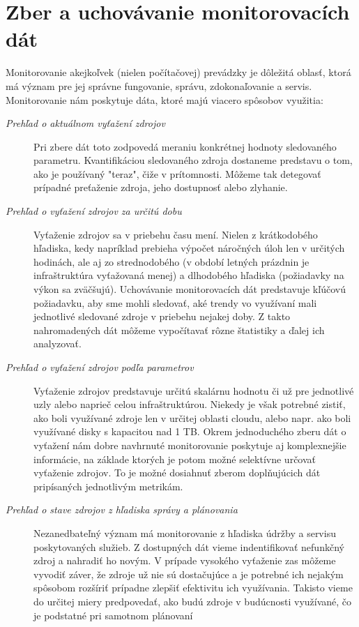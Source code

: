 \documentclass[printed,11pt,twoside,color,cover,table]{fithesis3}
\begin{document}
\chapter{Zber a uchovávanie monitorovacích dát}
Monitorovanie akejkoľvek (nielen počítačovej) prevádzky je dôležitá oblasť, ktorá má význam pre jej správne fungovanie, správu, zdokonaľovanie a servis. Monitorovanie nám poskytuje dáta, ktoré majú viacero 
spôsobov využitia:
\begin{description}
\item[\emph{Prehľad o aktuálnom vyťažení zdrojov}]
Pri zbere dát toto zodpovedá meraniu konkrétnej hodnoty sledovaného parametru. Kvantifikáciou sledovaného zdroja dostaneme predstavu o tom, ako je používaný "teraz", čiže v prítomnosti. Môžeme tak detegovať prípadné
preťaženie zdroja, jeho dostupnosť alebo zlyhanie.
\item[\emph{Prehľad o vyťažení zdrojov za určitú dobu}]
Vyťaženie zdrojov sa v priebehu času mení. Nielen z krátkodobého hľadiska, kedy napríklad prebieha výpočet náročných úloh len v určitých hodinách, ale aj zo strednodobého (v období letných prázdnin je infraštruktúra 
vyťažovaná menej) a dlhodobého hľadiska (požiadavky na výkon sa zväčšujú). Uchovávanie monitorovacích dát predstavuje kľúčovú požiadavku, aby sme mohli sledovať, aké trendy vo využívaní mali jednotlivé sledované zdroje v priebehu nejakej doby.
Z takto nahromadených dát môžeme vypočítavať rôzne štatistiky a ďalej ich analyzovať.
\item[\emph{Prehľad o vyťažení zdrojov podľa parametrov}]
Vyťaženie zdrojov predstavuje určitú skalárnu hodnotu či už pre jednotlivé uzly alebo naprieč celou infraštruktúrou. Niekedy je však potrebné zistiť, ako boli využívané zdroje len v určitej oblasti cloudu,
alebo napr. ako boli využívané disky s kapacitou nad 1 TB. Okrem jednoduchého zberu dát o vyťažení nám dobre navhrnuté monitorovanie poskytuje aj komplexnejšie informácie, na základe ktorých je potom možné
selektívne určovať vyťaženie zdrojov. To je možné dosiahnuť zberom doplňujúcich dát pripísaných jednotlivým metrikám.
\item[\emph{Prehľad o stave zdrojov z hľadiska správy a plánovania}]
Nezanedbateľný význam má monitorovanie z hľadiska údržby a servisu poskytovaných služieb. Z dostupných dát vieme indentifikovať nefunkčný zdroj a nahradiť ho novým. V prípade vysokého vyťaženie zas môžeme vyvodiť záver, že zdroje už nie sú
dostačujúce a je potrebné ich nejakým spôsobom rozšíriť prípadne zlepšiť efektivitu ich využívania. Takisto vieme do určitej miery predpovedať, ako budú zdroje v budúcnosti využívané, čo je podstatné pri samotnom plánovaní 

\end{description}
\end{document}
